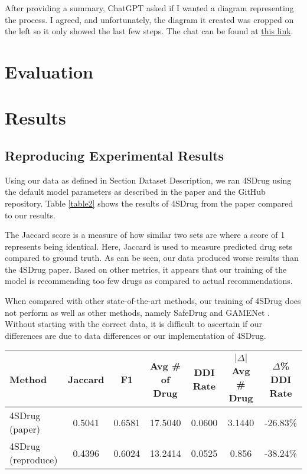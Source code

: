\documentclass[letterpaper]{article} %
\begin{document}
After providing a summary, ChatGPT asked if I wanted a diagram representing the process. I agreed, and unfortunately, the diagram it created was cropped on the left so it only showed the last few steps. The chat can be found at \href{https://chatgpt.com/share/67b12ffc-0688-8012-b16c-9e4fa21e0e3b}{this link}.

\section{Evaluation}
\section{Results}

\subsection{Reproducing Experimental Results}

Using our data as defined in Section Dataset Description, we ran 4SDrug using the default model parameters as described in the paper and the GitHub repository. Table \ref{table2} shows the results of 4SDrug from the paper compared to our results.

The Jaccard score is a measure of how similar two sets are where a score of 1 represents being identical. Here, Jaccard is used to measure predicted drug sets compared to ground truth. As can be seen, our data produced worse results than the 4SDrug paper. Based on other metrics, it appears that our training of the model is recommending too few drugs as compared to actual recommendations.

When compared with other state-of-the-art methods, our training of 4SDrug does not perform as well as other methods, namely SafeDrug and GAMENet \cite{shang2019gamenet}. Without starting with the correct data, it is difficult to ascertain if our differences are due to data differences or our implementation of 4SDrug.

\begin{table*}[t]
\centering
\begin{tabular}{l|c c c c c c }
Method & Jaccard & F1 & Avg \# of Drug & DDI Rate & $|\Delta|$Avg \# Drug & $\Delta$\% DDI Rate \\ 
\hline
4SDrug (paper) & 0.5041 & 0.6581 & 17.5040 & 0.0600 & 3.1440 & -26.83\%\\
4SDrug (reproduce)& 0.4396 & 0.6024 & 13.2414 & 0.0525 &  0.856 &  -38.24\% \\
\end{tabular}
\caption{Experimental Results - Recreating 4SDrug Table 3}
\label{table2}
\end{table*}
\end{document}
